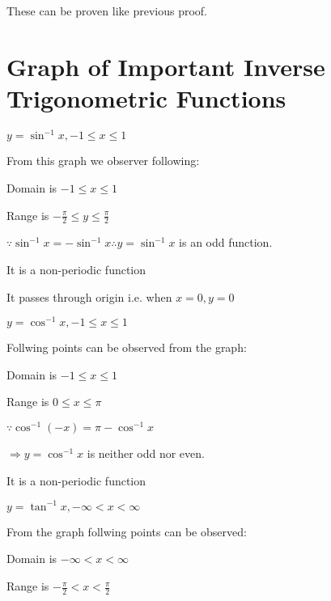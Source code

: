 These can be proven like previous proof.

\section{Graph of Important Inverse Trigonometric Functions}
\startitemize[n]
\item $y = \sin^{-1}x, -1\leq x\leq 1$
  \startplacefigure[title={}]
    \externalfigure[25_1.pdf]
  \stopplacefigure

   From this graph we observer following:
   \startitemize[n]
   \item Domain is $-1\leq x\leq 1$

   \item Range is $-\frac{\pi}{2}\leq y \leq \frac{\pi}{2}$

   \item $\because \sin^{-1}x = -\sin^{-1}x \therefore y = \sin^{-1}x$ is an odd function.

   \item It is a non-periodic function

   \item It passes through origin i.e. when $x = 0, y = 0$
   \stopitemize
 \item $y = \cos^{-1}x, -1\leq x\leq 1$
  \startplacefigure[title={}]
    \externalfigure[25_2.pdf]
  \stopplacefigure

   Follwing points can be observed from the graph:
   \startitemize[n]
   \item Domain is $-1\leq x\leq 1$

   \item Range is $0\leq x\leq \pi$

   \item $\because \cos^{-1}(-x) = \pi - \cos^{-1}x$

     $\Rightarrow y = \cos^{-1}x$ is neither odd nor even.

   \item It is a non-periodic function
   \stopitemize

 \item $y = \tan^{-1}x, -\infty< x <\infty$
  \startplacefigure[title={}]
    \externalfigure[25_3.pdf]
  \stopplacefigure

   From the graph follwing points can be observed:
   \startitemize[n]
   \item Domain is $-\infty < x < \infty$

   \item Range is $-\frac{\pi}{2} < x < \frac{\pi}{2}$

